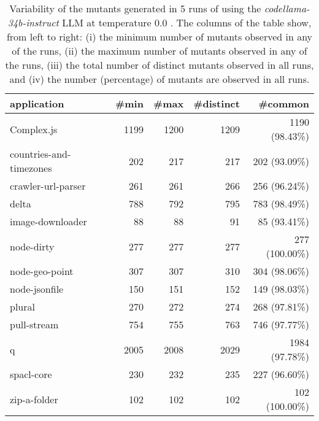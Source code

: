 
\begin{table}[hbt!]
\centering
{\footnotesize
\begin{tabular}{l|r|r|r|r}

{\bf application}  & {\bf \#min} &  {\bf \#max} &  {\bf \#distinct} & {\bf \#common}\\
\hline
Complex.js & 1199 & 1200 & 1209 & 1190 (98.43\%) \\ 
countries-and-timezones & 202 & 217 & 217 & 202 (93.09\%) \\ 
crawler-url-parser & 261 & 261 & 266 & 256 (96.24\%) \\ 
delta & 788 & 792 & 795 & 783 (98.49\%) \\ 
image-downloader & 88 & 88 & 91 & 85 (93.41\%) \\ 
node-dirty & 277 & 277 & 277 & 277 (100.00\%) \\ 
node-geo-point & 307 & 307 & 310 & 304 (98.06\%) \\ 
node-jsonfile & 150 & 151 & 152 & 149 (98.03\%) \\ 
plural & 270 & 272 & 274 & 268 (97.81\%) \\ 
pull-stream & 754 & 755 & 763 & 746 (97.77\%) \\ 
q & 2005 & 2008 & 2029 & 1984 (97.78\%) \\ 
spacl-core & 230 & 232 & 235 & 227 (96.60\%) \\ 
zip-a-folder & 102 & 102 & 102 & 102 (100.00\%) \\ 
\end{tabular}
}
\caption{
  Variability of the mutants generated in 5 runs of \ToolName using the \textit{codellama-34b-instruct} LLM
       at temperature 0.0 . The columns of the table show, from left to right:
    (i) the minimum number of mutants observed in any of the runs,
    (ii) the maximum number of mutants observed in any of the runs,
    (iii) the total number of distinct mutants observed in all runs, and
    (iv) the number (percentage) of mutants are observed in all runs.
}
\label{table:Variability_codellama-34b-instruct_0.0}
\end{table}